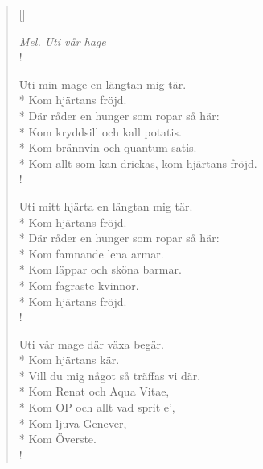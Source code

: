 
\settowidth{\versewidth}{Nej, för fan bara blunda och svälj}



\begin{verse}[\versewidth]

\flagverse{}
\emph{Mel. Uti vår hage}\\!

Uti min mage en längtan mig tär.\\*
Kom hjärtans fröjd.\\*
Där råder en hunger som ropar så här:\\*
Kom kryddsill och kall potatis.\\*
Kom brännvin och quantum satis.\\*
Kom allt som kan drickas, kom hjärtans fröjd.\\!

Uti mitt hjärta en längtan mig tär.\\*
Kom hjärtans fröjd.\\*
Där råder en hunger som ropar så här:\\*
Kom famnande lena armar.\\*
Kom läppar och sköna barmar.\\*
Kom fagraste kvinnor.\\*
Kom hjärtans fröjd.\\!

Uti vår mage där växa begär.\\*
Kom hjärtans kär.\\*
Vill du mig något så träffas vi där.\\*
Kom Renat och Aqua Vitae,\\*
Kom OP och allt vad sprit e',\\*
Kom ljuva Genever,\\*
Kom Överste.\\!


\end{verse}

